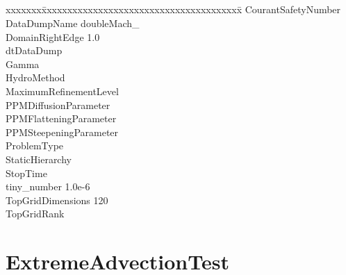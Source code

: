 \documentclass{book}
\begin{document}
\subsection{\enzo}

{\parametersize
\begin{tabbing}
xxxxxxx\=xxxxxxxxxxxxxxxxxxxxxxxxxxxxxxxxxxxxxxx\=\kill
\> CourantSafetyNumber          \\
\> DataDumpName           \> doubleMach\_ \\
\> DomainRightEdge         1.0 \\
\> dtDataDump              \\
\> Gamma                        \\
\> HydroMethod             \\
\> MaximumRefinementLevel     \\
\> PPMDiffusionParameter          \\
\> PPMFlatteningParameter         \\
\> PPMSteepeningParameter         \\
\> ProblemType                     \\
\> StaticHierarchy                \\
\> StopTime                \\
\> tiny\_number            \> 1.0e-6   \\
\> TopGridDimensions       120   \\
\> TopGridRank            
\end{tabbing}}

\subsection{\cello}

\section{ExtremeAdvectionTest} \label{s:ExtremeAdvectionTest}

\end{document}
